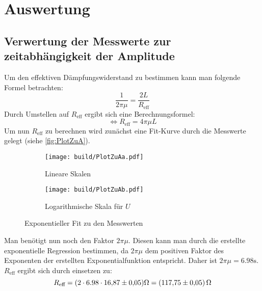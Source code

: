 \section{Auswertung}
\label{sec:Auswertung}
\subsection{Verwertung der Messwerte zur zeitabhängigkeit der Amplitude}
\label{subsec:AuswertungA}

Um den effektiven Dämpfungswiderstand zu bestimmen kann man folgende Formel betrachten: 
\begin{equation}
  \label{eqn:Abklingdauer}
  \frac{1}{2\pi\mu} = \frac{2L}{R_{\text{eff}}}
\end{equation}
Durch Umstellen auf $R_{\text{eff}}$ ergibt sich eine Berechnungsformel:
\begin{equation}
  \label{Abklingdauer1}
  \Longleftrightarrow R_{\text{eff}} = 4\pi\mu L
\end{equation}
Um nun $R_{\text{eff}}$ zu berechnen wird zunächst eine Fit-Kurve durch die Messwerte gelegt (siehe \autoref{fig:PlotZuA}).

\begin{figure}%
  \begin{subfigure}{0.48\textwidth}%
    \centering%
    \texttt{[image: build/PlotZuAa.pdf]}%
    \caption{Lineare Skalen}%
    \label{fig:PlotZuAa}%
  \end{subfigure}%
  \hfill%
  \begin{subfigure}{0.48\textwidth}%
    \centering%
    \texttt{[image: build/PlotZuAb.pdf]}%
    \caption{Logarithmische Skala für $U$}%
    \label{fig:PlotZuAb}%
    \end{subfigure}%
  \caption{Exponentieller Fit zu den Messwerten}%
  \label{fig:PlotZuA}%
\end{figure}%

Man benötigt nun noch den Faktor $2\pi\mu$. Diesen kann man durch die erstellte exponentielle Regression 
bestimmen, da $2\pi\mu$ dem positiven Faktor des Exponenten der erstellten Exponentialfunktion entspricht. 
Daher ist $2\pi\mu = 6.98\unit{\second}$.
$R_{\text{eff}}$ ergibt sich durch einsetzen zu:
\begin{equation*}
  R_{\text{eff}} = (2\cdot 6.98\cdot \num{16.87\pm 0.05}) \unit{\ohm} = (\num{117.75 \pm 0.05})\,\unit{\ohm}
\end{equation*}

